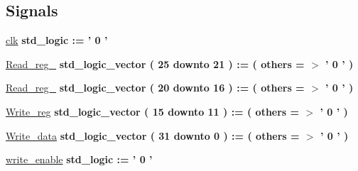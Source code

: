 \subsection*{\-Signals}
 \begin{DoxyCompactItemize}
\item 
\hypertarget{classregister__file__tb_1_1behavior_a3bcdf21e7dd60246a06d6c1fab716073}{\hyperlink{classregister__file__tb_1_1behavior_a3bcdf21e7dd60246a06d6c1fab716073}{clk} {\bfseries std\-\_\-logic  \-:= '  0  ' } }\label{classregister__file__tb_1_1behavior_a3bcdf21e7dd60246a06d6c1fab716073}

\item 
\hypertarget{classregister__file__tb_1_1behavior_aa0da7077dfd273150f20882878fdc3f0}{\hyperlink{classregister__file__tb_1_1behavior_aa0da7077dfd273150f20882878fdc3f0}{\-Read\-\_\-reg\-\_} {\bfseries std\-\_\-logic\-\_\-vector (   25    downto    21  )  \-:= (  others  = $>$ '  0  '  ) } }\label{classregister__file__tb_1_1behavior_aa0da7077dfd273150f20882878fdc3f0}

\item 
\hypertarget{classregister__file__tb_1_1behavior_a96cae136f8beb7b9459dd4d533d63b48}{\hyperlink{classregister__file__tb_1_1behavior_a96cae136f8beb7b9459dd4d533d63b48}{\-Read\-\_\-reg\-\_} {\bfseries std\-\_\-logic\-\_\-vector (   20    downto    16  )  \-:= (  others  = $>$ '  0  '  ) } }\label{classregister__file__tb_1_1behavior_a96cae136f8beb7b9459dd4d533d63b48}

\item 
\hypertarget{classregister__file__tb_1_1behavior_a418f436f7f50b54e93d3eb60399ac06d}{\hyperlink{classregister__file__tb_1_1behavior_a418f436f7f50b54e93d3eb60399ac06d}{\-Write\-\_\-reg} {\bfseries std\-\_\-logic\-\_\-vector (   15    downto    11  )  \-:= (  others  = $>$ '  0  '  ) } }\label{classregister__file__tb_1_1behavior_a418f436f7f50b54e93d3eb60399ac06d}

\item 
\hypertarget{classregister__file__tb_1_1behavior_ab01d9a5bc12390a056a5af5563cb38ef}{\hyperlink{classregister__file__tb_1_1behavior_ab01d9a5bc12390a056a5af5563cb38ef}{\-Write\-\_\-data} {\bfseries std\-\_\-logic\-\_\-vector (   31    downto    0  )  \-:= (  others  = $>$ '  0  '  ) } }\label{classregister__file__tb_1_1behavior_ab01d9a5bc12390a056a5af5563cb38ef}

\item 
\hypertarget{classregister__file__tb_1_1behavior_a03e4a4185b49fe459c673dd62519a014}{\hyperlink{classregister__file__tb_1_1behavior_a03e4a4185b49fe459c673dd62519a014}{write\-\_\-enable} {\bfseries std\-\_\-logic  \-:= '  0  ' } }\label{classregister__file__tb_1_1behavior_a03e4a4185b49fe459c673dd62519a014}


\end{DoxyCompactItemize}
